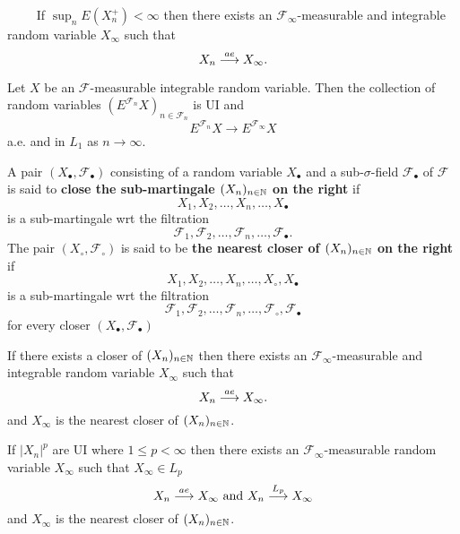 \begin{theorem} $\phantom{asdf}$
If $\sup_n E (X_n^+)<\infty$ then there exists an $\mathcal F_\infty$-measurable and integrable random variable $X_\infty$ such that
\[
X_n\overset{\small ae} \longrightarrow X_\infty.
\]
\end{theorem}


\begin{theorem}
Let $X$ be an $\mathcal F$-measurable integrable random variable. Then  the collection of random variables $(E^{\mathcal F_n} X)_{n\in\mathcal F_n}$ is UI and
\[
E^{\mathcal F_n} X \longrightarrow  E^{\mathcal F_\infty} X
\]
a.e. and in $L_1$
as $n \rightarrow \infty$.
\end{theorem}




\begin{definition}[{\bf A closer}]
 A pair $(X_\bullet, \mathcal F_\bullet)$ consisting of a random variable $X_\bullet$ and a sub-$\sigma$-field $\mathcal F_\bullet$ of $\mathcal F$ is said to {\bf close the sub-martingale $(X_n)_{n\in\Bbb N}$ on the right} if
 \[
 X_1, X_2, \ldots, X_n,\ldots, X_\bullet
 \]
 is a sub-martingale wrt the filtration
 \[
 \mathcal F_1, \mathcal F_2, \ldots, \mathcal F_n,\ldots, \mathcal F_\bullet.
 \]
 The pair $(X_\circ, \mathcal F_\circ)$ is said to be  {\bf the nearest closer of $(X_n)_{n\in\Bbb N}$ on the right} if
 \[
 X_1, X_2, \ldots, X_n,\ldots, X_\circ, X_\bullet
 \]
 is a sub-martingale wrt the filtration
 \[
 \mathcal F_1, \mathcal F_2, \ldots, \mathcal F_n,\ldots,\mathcal F_\circ,  \mathcal F_\bullet
 \]
 for every closer $(X_\bullet, \mathcal F_\bullet)$
\end{definition}




\begin{theorem}
If there exists a closer of $(X_n)_{n\in \Bbb N}$  then there exists an $\mathcal F_\infty$-measurable and integrable random variable $X_\infty$ such that
\[
X_n\overset{\small ae} \longrightarrow X_\infty.
\]
and $X_\infty$ is the nearest closer of $(X_n)_{n\in \Bbb N}$.
\end{theorem}




\begin{theorem}
If  $|X_n|^p$ are UI where $1\leq p < \infty$ then there exists an $\mathcal F_\infty$-measurable random variable $X_\infty$  such that $X_\infty\in L_p$
\[
X_n\overset{\small ae} \longrightarrow X_\infty \text{ and } X_n\overset{\small L_p} \longrightarrow X_\infty
\]
and $X_\infty$ is the nearest closer of $(X_n)_{n\in \Bbb N}$.
\end{theorem}




